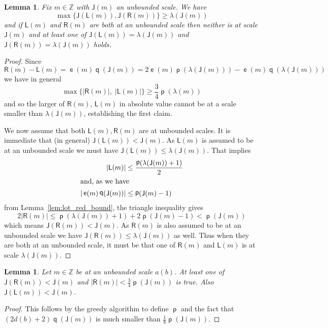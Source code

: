 \documentclass[10pt]{amsart}
\newtheorem{lemm}[theo]{Lemma}\newtheorem{prop}[theo]{Proposition}\newtheorem{coro}[theo]{Corollary}\newtheorem{conj}[theo]{Conjecture}
\theoremstyle{definition}\newtheorem{defi}[theo]{Definition}\newtheorem{rema}[theo]{Remark}\newtheorem{exam}[theo]{Example}\newtheorem{exem}[theo]{Example}\newtheorem{nota}[theo]{Notation}
\DeclareMathOperator{\lst}{\mathsf{e}}
\DeclareMathOperator{\p}{\mathsf{p}}
\DeclareMathOperator{\q}{\mathsf{q}}
\newcommand{\Z}{\mathbb{Z}}
\newcommand{\lft}{\mathsf{L}}
\newcommand{\rht}{\mathsf{R}}
\newcommand{\scl}{\mathsf{J}}
\begin{document}
\begin{lemm}\label{lem: reduction not both small}
Fix $m \in \Z$ with $\scl(m)$ an unbounded scale. We have
\[
\max\{\scl(\lft(m)), \scl(\rht(m))\} \ge \lambda(\scl(m))
\]
and if $\lft(m)$ and $\rht(m)$ are both at an unbounded scale then neither is at scale $\scl(m)$ and at least one of $\scl(\lft(m)) = \lambda(\scl(m))$ and $\scl(\rht(m)) = \lambda(\scl(m))$ holds.
\end{lemm}
\begin{proof}
Since
\begin{equation}\label{eq:differnce in reduction}
\rht(m) - \lft(m) = \lst(m) \q(\scl(m)) = 2 \lst(m) \p(\lambda(\scl(m))) - \lst(m) \q(\lambda(\scl(m)))
\end{equation}
we have in general
\begin{equation}\label{eq:one correct}
\max\{|\rht(m)|,\;|\lft(m)|\}\geq \frac{3}{4} \p(\lambda(m))
\end{equation}
and so the larger of $\rht(m)$, $\lft(m)$ in absolute value cannot be at a scale smaller than $\lambda(\scl(m))$, establishing the first claim.

We now assume that both $\lft(m),\rht(m)$ are at unbounded scales. It is immediate that (in general) $\scl(\lft(m)) < \scl(m)$. As $\lft(m)$ is assumed to be at an unbounded scale we must have $\scl(\lft(m)) \le \lambda(\scl(m))$. That implies
\begin{align*}
|\lft(m)| &\le \frac{\p(\lambda(\scl(m))+1)}{2}
\\
\intertext{and, as we have}
|\lst(m) \q(\scl(m))| &\le \p(\scl(m)-1)
\end{align*}
from Lemma~\ref{lem:lot_red_bound}, the triangle inequality gives
\[
2|\rht(m)| \le \p(\lambda(\scl(m))+1) + 2\p(\scl(m)-1) < \p(\scl(m))
\]
which means $\scl(\rht(m)) < \scl(m)$. As $\rht(m)$ is also assumed to be at an unbounded scale we have $\scl(\rht(m)) \le \lambda(\scl(m))$ as well. Thus when they are both at an unbounded scale, it must be that one of $\rht(m)$ and $\lft(m)$ is at scale $\lambda(\scl(m))$.
\end{proof}

\begin{lemm}\label{lem:reduction LR}
Let $m \in \Z$ be at an unbounded scale $a(b)$. At least one of $\scl(\rht(m)) < \scl(m)$ and $|\rht(m)|<\frac{3}{4}\p(\scl(m))$ is true. Also $\scl(\lft(m)) < \scl(m)$.
\end{lemm}
\begin{proof}
This follows by the greedy algorithm to define $\p$ and the fact that $(2d(b)+2)\q(\scl(m))$ is much smaller than $\frac{1}{8} \p(\scl(m))$.
\end{proof}
\end{document}
